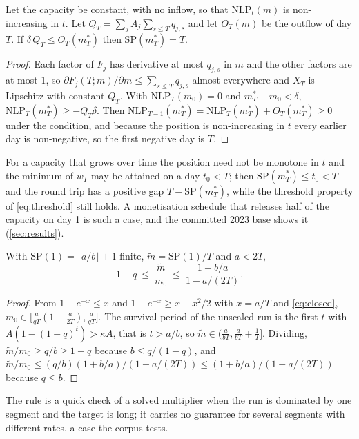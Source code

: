\begin{proposition}
\label{prop:roundtrip}
Let the capacity be constant, with no inflow, so that $\mathrm{NLP}_t(m)$ is non-increasing in $t$. Let $Q_T=\sum_jA_j\sum_{s\le T}q_{j,s}$ and let $O_T(m)$ be the outflow of day $T$. If $\delta\,Q_T\le O_T(m^\ast_T)$ then $\mathrm{SP}(m^\ast_T)=T$.
\end{proposition}
\begin{proof}
Each factor of $F_j$ has derivative at most $q_{j,s}$ in $m$ and the other factors are at most 1, so $\partial F_j(T;m)/\partial m\le\sum_{s\le T}q_{j,s}$ almost everywhere and $X_T$ is Lipschitz with constant $Q_T$. With $\mathrm{NLP}_T(m_0)=0$ and $m^\ast_T-m_0<\delta$, $\mathrm{NLP}_T(m^\ast_T)\ge-Q_T\delta$. Then $\mathrm{NLP}_{T-1}(m^\ast_T)=\mathrm{NLP}_T(m^\ast_T)+O_T(m^\ast_T)\ge0$ under the condition, and because the position is non-increasing in $t$ every earlier day is non-negative, so the first negative day is $T$.
\end{proof}
For a capacity that grows over time the position need not be monotone in $t$ and the minimum of $w_T$ may be attained on a day $t_0<T$; then $\mathrm{SP}(m^\ast_T)\le t_0<T$ and the round trip has a positive gap $T-\mathrm{SP}(m^\ast_T)$, while the threshold property of \cref{eq:threshold} still holds. A monetisation schedule that releases half of the capacity on day 1 is such a case, and the committed 2023 base shows it (\cref{sec:results}).

\begin{proposition}
\label{prop:hyperbolic}
With $\mathrm{SP}(1)=\lfloor a/b\rfloor+1$ finite, $\tilde m=\mathrm{SP}(1)/T$ and $a<2T$,
\begin{equation}
1-q\ \le\ \frac{\tilde m}{m_0}\ \le\ \frac{1+b/a}{1-a/(2T)}.
\label{eq:hyperbolic}
\end{equation}
\end{proposition}
\begin{proof}
From $1-e^{-x}\le x$ and $1-e^{-x}\ge x-x^2/2$ with $x=a/T$ and \cref{eq:closed}, $m_0\in\bigl[\tfrac{a}{qT}(1-\tfrac{a}{2T}),\tfrac{a}{qT}\bigr]$. The survival period of the unscaled run is the first $t$ with $A(1-(1-q)^t)>\kappa A$, that is $t>a/b$, so $\tilde m\in(\tfrac{a}{bT},\tfrac{a}{bT}+\tfrac1T]$. Dividing, $\tilde m/m_0\ge q/b\ge1-q$ because $b\le q/(1-q)$, and $\tilde m/m_0\le(q/b)(1+b/a)/(1-a/(2T))\le(1+b/a)/(1-a/(2T))$ because $q\le b$.
\end{proof}
The rule is a quick check of a solved multiplier when the run is dominated by one segment and the target is long; it carries no guarantee for several segments with different rates, a case the corpus tests.

